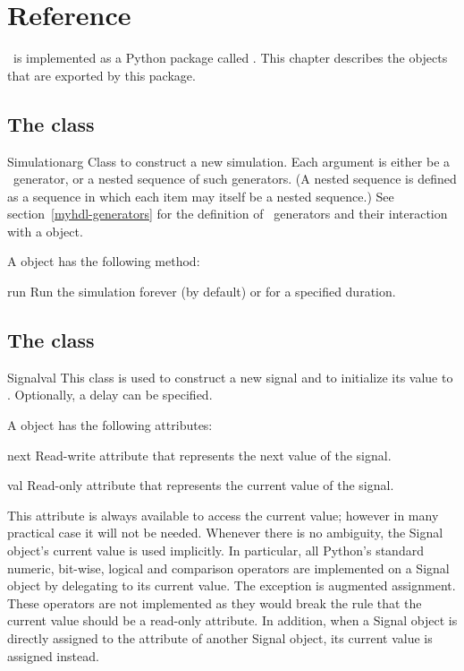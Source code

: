 \chapter{Reference}


\myhdl\ is implemented as a Python package called . This
chapter describes the objects that are exported by this package.

\section{The  class}
\begin{classdesc}{Simulation}{arg }
Class to construct a new simulation. Each argument is either be a
\myhdl\ generator, or a nested sequence of such generators. (A nested
sequence is defined as a sequence in which each item may itself be a
nested sequence.) See section~\ref{myhdl-generators} for the
definition of \myhdl\ generators and their interaction with a
 object.
\end{classdesc}

A  object has the following method:

\begin{methoddesc}[Simulation]{run}{}
Run the simulation forever (by default) or for a specified duration.
\end{methoddesc}

\section{The  class}
\label{signal}
\begin{classdesc}{Signal}{val }
This class is used to construct a new signal and to initialize its
value to . Optionally, a delay can be specified.
\end{classdesc}

A  object has the following attributes:

\begin{memberdesc}[Signal]{next}
Read-write attribute that represents the next value of the signal.
\end{memberdesc}

\begin{memberdesc}[Signal]{val}
Read-only attribute that represents the current value of the signal.

This attribute is always available to access the current value;
however in many practical case it will not be needed. Whenever there
is no ambiguity, the Signal object's current value is used
implicitly. In particular, all Python's standard numeric, bit-wise,
logical and comparison operators are implemented on a Signal object by
delegating to its current value. The exception is augmented
assignment. These operators are not implemented as they would break
the rule that the current value should be a read-only attribute. In
addition, when a Signal object is directly assigned to the 
attribute of another Signal object, its current value is assigned
instead.
\end{memberdesc}



